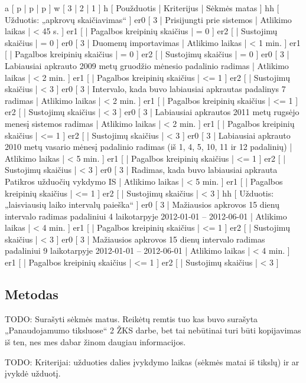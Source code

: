 \xtableu
{
  a [ p | p | p ]
  w [ 3 | 2 | 1 ]
  h [ Použduotis | Kriterijus | Sėkmės matas ]
  hh [ Užduotis: „apkrovų skaičiavimas“ ]
  er0 [ 3 | Prisijungti prie sistemos 
    | Atlikimo laikas | < 45 s. ]
  er1 [ 
    | Pagalbos kreipinių skaičius | = 0 ]
  er2 [ 
    | Sustojimų skaičius | = 0 ]
  er0 [ 3 | Duomenų importavimas 
    | Atlikimo laikas | < 1 min. ]
  er1 [
    | Pagalbos kreipinių skaičius | = 0 ]
  er2 [ 
    | Sustojimų skaičius | = 0 ]
  er0 [ 3 | Labiausiai apkrauto 2009 metų gruodžio mėnesio padalinio radimas 
    | Atlikimo laikas | < 2 min. ]
  er1 [
    | Pagalbos kreipinių skaičius | <= 1 ]
  er2 [ 
    | Sustojimų skaičius | < 3 ]
  er0 [ 3 | Intervalo, kada buvo labiausiai apkrautas padalinys 7 radimas 
    | Atlikimo laikas | < 2 min. ]
  er1 [
    | Pagalbos kreipinių skaičius | <= 1 ]
  er2 [ 
    | Sustojimų skaičius | < 3 ]
  er0 [ 3 | Labiausiai apkrautos 2011 metų rugsėjo menesį sistemos radimas 
         | Atlikimo laikas | < 2 min. ]
  er1 [ | Pagalbos kreipinių skaičius | <= 1 ]
  er2 [ | Sustojimų skaičius | < 3 ]
  er0 [ 3 | Labiausiai apkrauto 2010 metų vasario mėnesį padalinio radimas
      (iš 1, 4, 5, 10, 11 ir 12 padalinių) 
    | Atlikimo laikas | < 5 min. ]
  er1 [
    | Pagalbos kreipinių skaičius | <= 1 ]
  er2 [ 
    | Sustojimų skaičius | < 3 ]
  er0 [ 3 | Radimas, kada buvo labiausiai apkrauta Patikros užduočių vykdymo IS 
    | Atlikimo laikas | < 5 min. ]
  er1 [
    | Pagalbos kreipinių skaičius | <= 1 ]
  er2 [ 
    | Sustojimų skaičius | < 3 ]
  hh [ Užduotis: „laisviausių laiko intervalų paieška“ ]
  er0 [ 3 | Mažiausios apkrovos 15 dienų intervalo radimas padaliniui 
      4 laikotarpyje 2012-01-01 – 2012-06-01 
    | Atlikimo laikas | < 4 min. ]
  er1 [
    | Pagalbos kreipinių skaičius | <= 1 ]
  er2 [ 
    | Sustojimų skaičius | < 3 ]
  er0 [ 3 | Mažiausios apkrovos 15 dienų intervalo radimas padaliniui 
      9 laikotarpyje 2012-01-01 – 2012-06-01 
    | Atlikimo laikas | < 4 min. ]
  er1 [
    | Pagalbos kreipinių skaičius | <= 1 ]
  er2 [ 
    | Sustojimų skaičius | < 3 ]
}

\subsection{Metodas}
TODO: Surašyti sėkmės matus. Reikėtų remtis tuo kas buvo surašyta
„Panaudojamumo tiksluose“ 2 ŽKS darbe, bet tai nebūtinai turi būti
kopijavimas iš ten, nes mes dabar žinom daugiau informacijos.

TODO: Kriterijai: užduoties dalies įvykdymo laikas (sėkmės matai iš
tikslų) ir ar įvykdė užduotį.

